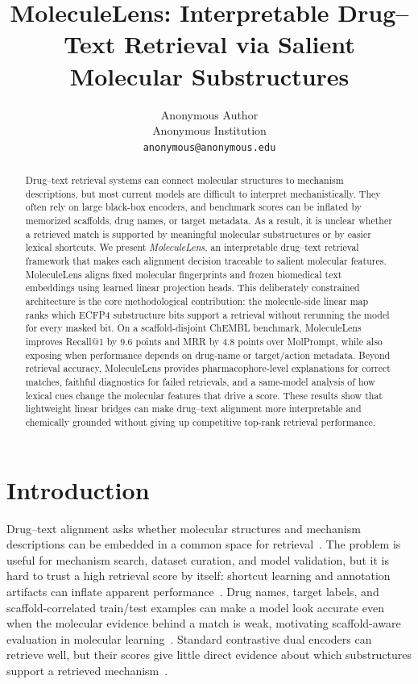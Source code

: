 \documentclass{article}
\title{MoleculeLens: Interpretable Drug--Text Retrieval via Salient Molecular Substructures}
\author{%
Anonymous Author\\
Anonymous Institution \\
\texttt{anonymous@anonymous.edu}
}
\begin{document}
\maketitle

\begin{abstract}
Drug--text retrieval systems can connect molecular structures to mechanism descriptions, but most current models are difficult to interpret mechanistically. They often rely on large black-box encoders, and benchmark scores can be inflated by memorized scaffolds, drug names, or target metadata. As a result, it is unclear whether a retrieved match is supported by meaningful molecular substructures or by easier lexical shortcuts. We present \textit{MoleculeLens}, an interpretable drug--text retrieval framework that makes each alignment decision traceable to salient molecular features. MoleculeLens aligns fixed molecular fingerprints and frozen biomedical text embeddings using learned linear projection heads. This deliberately constrained architecture is the core methodological contribution: the molecule-side linear map ranks which ECFP4 substructure bits support a retrieval without rerunning the model for every masked bit. On a scaffold-disjoint ChEMBL benchmark, MoleculeLens improves Recall@1 by 9.6 points and MRR by 4.8 points over MolPrompt, while also exposing when performance depends on drug-name or target/action metadata. Beyond retrieval accuracy, MoleculeLens provides pharmacophore-level explanations for correct matches, faithful diagnostics for failed retrievals, and a same-model analysis of how lexical cues change the molecular features that drive a score. These results show that lightweight linear bridges can make drug--text alignment more interpretable and chemically grounded without giving up competitive top-rank retrieval performance.
\end{abstract}

\section{Introduction}

Drug--text alignment asks whether molecular structures and mechanism descriptions can be embedded in a common space for retrieval~\citep{edwards2021text2mol,liu2023moleculestm,zeng2022kvplm}. The problem is useful for mechanism search, dataset curation, and model validation, but it is hard to trust a high retrieval score by itself: shortcut learning and annotation artifacts can inflate apparent performance~\citep{gururangan2018annotation,geirhos2020shortcut}. Drug names, target labels, and scaffold-correlated train/test examples can make a model look accurate even when the molecular evidence behind a match is weak, motivating scaffold-aware evaluation in molecular learning~\citep{bemis1996frameworks,wu2018moleculenet}. Standard contrastive dual encoders can retrieve well, but their scores give little direct evidence about which substructures support a retrieved mechanism~\citep{radford2021clip,edwards2021text2mol}.
\end{document}
